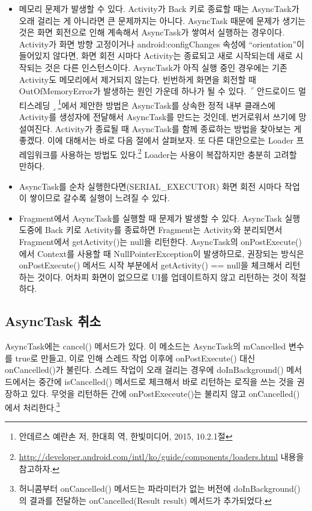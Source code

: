 \begin{itemize}
\item 메모리 문제가 발생할 수 있다. Activity가 Back 키로 종료할 때는 AsyncTask가 오래 걸리는 게 아니라면 큰 문제까지는 아니다. 
AsyncTask 때문에 문제가 생기는 것은 화면 회전으로 인해 계속해서 AsyncTask가 쌓여서 실행하는 경우이다.
Activity가 화면 방향 고정이거나 android:configChanges 속성에 ``orientation''이 들어있지 않다면, 화면 회전 시마다 Activity는 종료되고 새로 시작되는데 새로 시작되는 것은 다른 인스턴스이다. 
AsyncTask가 아직 실행 중인 경우에는 기존 Activity도 메모리에서 제거되지 않는다. 
빈번하게 화면을 회전할 때 OutOfMemoryError가 발생하는 원인 가운데 하나가 될 수 있다.
$\ulcorner$안드로이드 멀티스레딩$\lrcorner$\footnote{안데르스 예란손 저, 한대희 역, 한빛미디어, 2015, 10.2.1절}에서 제안한 방법은 AsyncTask를 상속한 정적 내부 클래스에 Activity를 생성자에 전달해서 AsyncTask를 만드는 것인데, 번거로워서 쓰기에 망설여진다. 
Activity가 종료될 때 AsyncTask를 함께 종료하는 방법을 찾아보는 게 좋겠다. 이에 대해서는 바로 다음 절에서 살펴보자.  
또 다른 대안으로는 Loader 프레임워크를 사용하는 방법도 있다.\footnote{\url{http://developer.android.com/intl/ko/guide/components/loaders.html} 내용을 참고하자.}
Loader는 사용이 복잡하지만 충분히 고려할 만하다. 

\item AsyncTask를 순차 실행한다면(SERIAL\_EXECUTOR) 화면 회전 시마다 작업이 쌓이므로 갈수록 실행이 느려질 수 있다.

\item Fragment에서 AsyncTask를 실행할 때 문제가 발생할 수 있다. 
AsyncTask 실행 도중에 Back 키로 Activity를 종료하면 Fragment는 Activity와 분리되면서 Fragment에서 getActivity()는 null을 리턴한다. 
AsyncTask의 onPostExecute()에서 Context를 사용할 때 NullPointerException이 발생하므로, 권장되는 방식은 onPostExecute() 메서드 시작 부분에서 getActivity() == null을 체크해서 리턴하는 것이다. 어차피 화면이 없으므로 UI를 업데이트하지 않고 리턴하는 것이 적절하다. 
\end{itemize}

\subsection{AsyncTask 취소}
AsyncTask에는 cancel() 메서드가 있다. 이 메소드는 AsyncTask의 mCancelled 변수를 true로 만들고, 이로 인해 스레드 작업 이후에 onPostExecute() 대신 onCancelled()가 불린다. 
스레드 작업이 오래 걸리는 경우에 doInBackground() 메서드에서는 중간에 isCancelled() 메서드로 체크해서 바로 리턴하는 로직을 쓰는 것을 권장하고 있다. 
무엇을 리턴하든 간에 onPostExeceute()는 불리지 않고 onCancelled()에서 처리한다.\footnote{허니콤부터 onCancelled() 메서드는 파라미터가 없는 버전에 doInBackground()의 결과를 전달하는 onCancelled(Result result) 메서드가 추가되었다.}\\


